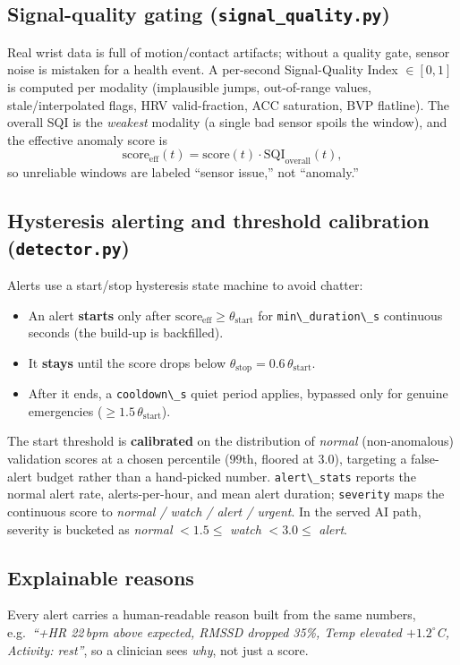 \documentclass[11pt,a4paper]{article}
\newcommand{\code}[1]{\lstinline[basicstyle=\ttfamily\normalsize]!#1!}
\begin{document}
\subsection{Signal-quality gating (\texttt{signal\_quality.py})}
Real wrist data is full of motion/contact artifacts; without a quality gate,
sensor noise is mistaken for a health event. A per-second Signal-Quality Index
$\in[0,1]$ is computed per modality (implausible jumps, out-of-range values,
stale/interpolated flags, HRV valid-fraction, ACC saturation, BVP flatline). The
overall SQI is the \emph{weakest} modality (a single bad sensor spoils the
window), and the effective anomaly score is
\[
\text{score}_{\text{eff}}(t)=\text{score}(t)\cdot \text{SQI}_{\text{overall}}(t),
\]
so unreliable windows are labeled ``sensor issue,'' not ``anomaly.''

\subsection{Hysteresis alerting and threshold calibration (\texttt{detector.py})}
Alerts use a start/stop hysteresis state machine to avoid chatter:
\begin{itemize}[leftmargin=1.4em,itemsep=2pt]
\item An alert \textbf{starts} only after $\text{score}_{\text{eff}}\ge
      \theta_{\text{start}}$ for \code{min\_duration\_s} continuous seconds
      (the build-up is backfilled).
\item It \textbf{stays} until the score drops below
      $\theta_{\text{stop}}=0.6\,\theta_{\text{start}}$.
\item After it ends, a \code{cooldown\_s} quiet period applies, bypassed only for
      genuine emergencies ($\ge 1.5\,\theta_{\text{start}}$).
\end{itemize}
The start threshold is \textbf{calibrated} on the distribution of
\emph{normal} (non-anomalous) validation scores at a chosen percentile
($99$th, floored at 3.0), targeting a false-alert budget rather than a
hand-picked number. \code{alert\_stats} reports the normal alert rate,
alerts-per-hour, and mean alert duration; \code{severity} maps the continuous
score to \emph{normal / watch / alert / urgent}. In the served AI path,
severity is bucketed as \emph{normal} $<1.5\le$ \emph{watch} $<3.0\le$
\emph{alert}.

\subsection{Explainable reasons}
Every alert carries a human-readable reason built from the same numbers, e.g.\
\emph{``+HR 22\,bpm above expected, RMSSD dropped 35\%, Temp elevated
$+1.2^\circ$C, Activity: rest''}, so a clinician sees \emph{why}, not just a
score.
\end{document}
